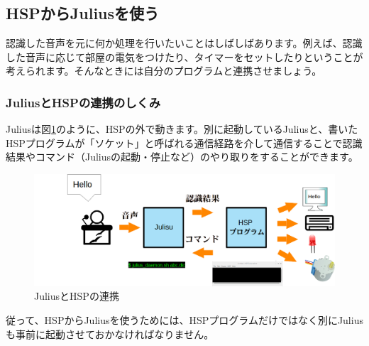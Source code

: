 \subsection{HSPからJuliusを使う}
認識した音声を元に何か処理を行いたいことはしばしばあります。例えば、認識した音声に応じて部屋の電気をつけたり、タイマーをセットしたりということが考えられます。そんなときには自分のプログラムと連携させましょう。
\subsubsection{JuliusとHSPの連携のしくみ}
Juliusは図\ref{JuliusとHSPの連携}のように、HSPの外で動きます。別に起動しているJuliusと、書いたHSPプログラムが「ソケット」と呼ばれる通信経路を介して通信することで認識結果やコマンド（Juliusの起動・停止など）のやり取りをすることができます。
\begin{figure}[H]
\begin{center}
    \includegraphics[width=\linewidth]{images/chap06/text06-img010.png}
    \caption{JuliusとHSPの連携}
    \label{JuliusとHSPの連携}
\end{center}
\end{figure}
従って、HSPからJuliusを使うためには、HSPプログラムだけではなく別にJuliusも事前に起動させておかなければなりません。

